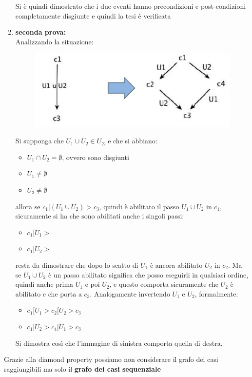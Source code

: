\begin{enumerate}
  Si è quindi dimostrato che i due eventi hanno precondizioni e post-condizioni
  completamente disgiunte e quindi la tesi è verificata
  \item \textbf{seconda prova:}\\
  Analizzando la situazione:
  \begin{figure}[H]
    \centering
    \includegraphics[scale = 0.45]{img/diam2.jpg}
  \end{figure}
  \newpage
  Si supponga che $U_1\cup U_2\in U_\Sigma$ e che si abbiano:
  \begin{itemize}
    \item $U_1\cap U_2=\emptyset$, ovvero sono disgiunti
    \item $U_1\neq\emptyset$
    \item $U_2\neq\emptyset$
  \end{itemize}
  allora se $c_1[(U_1\cup U_2)>c_3$, quindi è abilitato il passo $U_1\cup U_2$
  in $c_1$, sicuramente si ha che sono abilitati anche i singoli passi:
  \begin{itemize}
    \item $c_1[U_1>$
    \item $c_1[U_2>$
  \end{itemize}
  resta da dimostrare che dopo lo scatto di $U_1$ è ancora abilitato $U_2$ in
  $c_2$. Ma se $U_1\cup U_2$ è un passo abilitato significa che posso eseguirli
  in qualsiasi ordine, quindi anche prima $U_1$ e poi $U_2$, e questo comporta
  sicuramente che $U_2$ è abilitato e che porta a $c_3$. Analogamente invertendo
  $U_1$ e $U_2$, formalmente: 
  \begin{itemize}
    \item $c_1[U_1>c_2[U_2>c_3$
    \item $c_1[U_2>c_4[U_1>c_3$
  \end{itemize}
  Si dimostra così che l'immagine di sinistra comporta quella di destra.
\end{enumerate}
\begin{nota}
Grazie alla diamond property possiamo non considerare il grafo dei casi
raggiungibili ma solo il \textbf{grafo dei casi sequenziale}
\end{nota}
